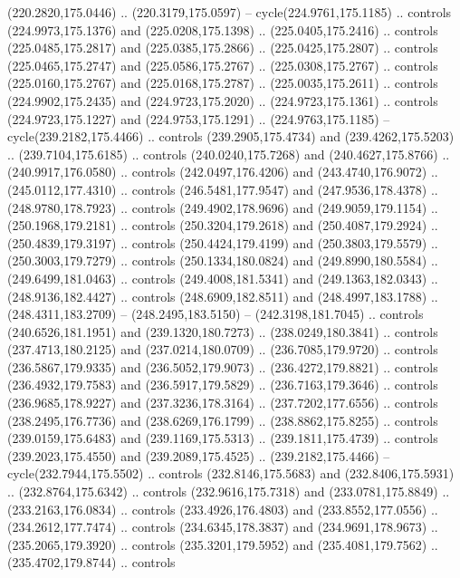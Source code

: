 \begin{scope}[cm={{1.25,0.0,0.0,-1.25,(0.0,442.91375)}}]
    (220.2820,175.0446) .. (220.3179,175.0597) -- cycle(224.9761,175.1185) ..
    controls (224.9973,175.1376) and (225.0208,175.1398) .. (225.0405,175.2416) ..
    controls (225.0485,175.2817) and (225.0385,175.2866) .. (225.0425,175.2807) ..
    controls (225.0465,175.2747) and (225.0586,175.2767) .. (225.0308,175.2767) ..
    controls (225.0160,175.2767) and (225.0168,175.2787) .. (225.0035,175.2611) ..
    controls (224.9902,175.2435) and (224.9723,175.2020) .. (224.9723,175.1361) ..
    controls (224.9723,175.1227) and (224.9753,175.1291) .. (224.9763,175.1185) --
    cycle(239.2182,175.4466) .. controls (239.2905,175.4734) and
    (239.4262,175.5203) .. (239.7104,175.6185) .. controls (240.0240,175.7268) and
    (240.4627,175.8766) .. (240.9917,176.0580) .. controls (242.0497,176.4206) and
    (243.4740,176.9072) .. (245.0112,177.4310) .. controls (246.5481,177.9547) and
    (247.9536,178.4378) .. (248.9780,178.7923) .. controls (249.4902,178.9696) and
    (249.9059,179.1154) .. (250.1968,179.2181) .. controls (250.3204,179.2618) and
    (250.4087,179.2924) .. (250.4839,179.3197) .. controls (250.4424,179.4199) and
    (250.3803,179.5579) .. (250.3003,179.7279) .. controls (250.1334,180.0824) and
    (249.8990,180.5584) .. (249.6499,181.0463) .. controls (249.4008,181.5341) and
    (249.1363,182.0343) .. (248.9136,182.4427) .. controls (248.6909,182.8511) and
    (248.4997,183.1788) .. (248.4311,183.2709) -- (248.2495,183.5150) --
    (242.3198,181.7045) .. controls (240.6526,181.1951) and (239.1320,180.7273) ..
    (238.0249,180.3841) .. controls (237.4713,180.2125) and (237.0214,180.0709) ..
    (236.7085,179.9720) .. controls (236.5867,179.9335) and (236.5052,179.9073) ..
    (236.4272,179.8821) .. controls (236.4932,179.7583) and (236.5917,179.5829) ..
    (236.7163,179.3646) .. controls (236.9685,178.9227) and (237.3236,178.3164) ..
    (237.7202,177.6556) .. controls (238.2495,176.7736) and (238.6269,176.1799) ..
    (238.8862,175.8255) .. controls (239.0159,175.6483) and (239.1169,175.5313) ..
    (239.1811,175.4739) .. controls (239.2023,175.4550) and (239.2089,175.4525) ..
    (239.2182,175.4466) -- cycle(232.7944,175.5502) .. controls
    (232.8146,175.5683) and (232.8406,175.5931) .. (232.8764,175.6342) .. controls
    (232.9616,175.7318) and (233.0781,175.8849) .. (233.2163,176.0834) .. controls
    (233.4926,176.4803) and (233.8552,177.0556) .. (234.2612,177.7474) .. controls
    (234.6345,178.3837) and (234.9691,178.9673) .. (235.2065,179.3920) .. controls
    (235.3201,179.5952) and (235.4081,179.7562) .. (235.4702,179.8744) .. controls

\end{scope}
